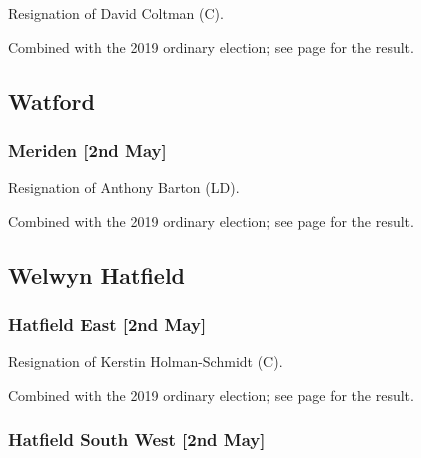 \documentclass[a4paper,openany]{book}
\begin{document}
\begin{resultsiii}

Resignation of David Coltman (C).

Combined with the 2019 ordinary election; see page \pageref{CarpendersParkThreeRivers} for the result.

\subsection*{Watford}

\subsubsection*{Meriden \hspace*{\fill}\nolinebreak[1]%
	\enspace\hspace*{\fill}
	[2nd May]}


Resignation of Anthony Barton (LD).

Combined with the 2019 ordinary election; see page \pageref{WatfordMeriden} for the result.

\subsection*{Welwyn Hatfield}

\subsubsection*{Hatfield East \hspace*{\fill}\nolinebreak[1]%
	\enspace\hspace*{\fill}
	[2nd May]}


Resignation of Kerstin Holman-Schmidt (C).

Combined with the 2019 ordinary election; see page \pageref{HatfieldEastWelwynHatfield} for the result.

\subsubsection*{Hatfield South West \hspace*{\fill}\nolinebreak[1]%
	\enspace\hspace*{\fill}
	[2nd May]}


\end{resultsiii}
\end{document}
